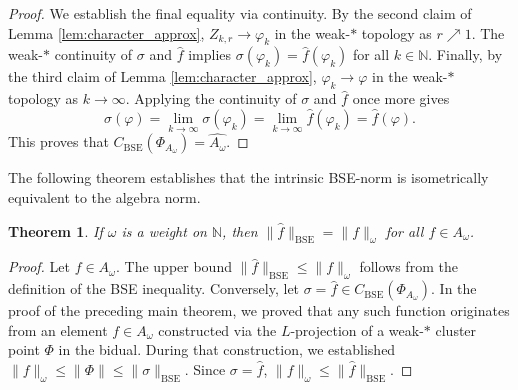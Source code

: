 \documentclass{amsart}
\newtheorem{theorem}{Theorem}[section]
\theoremstyle{definition}
\theoremstyle{remark}
\numberwithin{equation}{section}
\begin{document}
\begin{proof}
We establish the final equality via continuity. By the second claim of Lemma \ref{lem:character_approx}, $Z_{k,r} \to \varphi_k$ in the weak-$\ast$ topology as $r \nearrow 1$. The weak-$\ast$ continuity of $\sigma$ and $\widehat{f}$ implies $\sigma(\varphi_k) = \widehat{f}(\varphi_k)$ for all $k \in \mathbb N$. Finally, by the third claim of Lemma \ref{lem:character_approx}, $\varphi_k \to \varphi$ in the weak-$\ast$ topology as $k \to \infty$. Applying the continuity of $\sigma$ and $\widehat{f}$ once more gives
$$\sigma(\varphi) = \lim_{k \to \infty} \sigma(\varphi_k) = \lim_{k \to \infty} \widehat{f}(\varphi_k) = \widehat{f}(\varphi).$$
This proves that $C_{\operatorname{BSE}}(\Phi_{A_\omega}) = \widehat{A_\omega}$.
\end{proof}

The following theorem establishes that the intrinsic BSE-norm is isometrically equivalent to the algebra norm.

\begin{theorem}
If $\omega$ is a weight on $\mathbb{N}$, then $\|\widehat{f}\|_{\operatorname{BSE}} = \|f\|_\omega$ for all $f \in A_\omega$.
\end{theorem}

\begin{proof}
Let $f \in A_\omega$. The upper bound $\|\widehat{f}\|_{\operatorname{BSE}} \leq \|f\|_\omega$ follows from the definition of the BSE inequality. Conversely, let $\sigma = \widehat{f} \in C_{\operatorname{BSE}}(\Phi_{A_\omega})$. In the proof of the preceding main theorem, we proved that any such function originates from an element $f \in A_\omega$ constructed via the $L$-projection of a weak-$\ast$ cluster point $\Phi$ in the bidual. During that construction, we established $\|f\|_\omega \leq \|\Phi\| \leq \|\sigma\|_{\operatorname{BSE}}$. Since $\sigma = \widehat{f}$, $\|f\|_\omega \leq \|\widehat{f}\|_{\operatorname{BSE}}$.
\end{proof}
\end{document}
